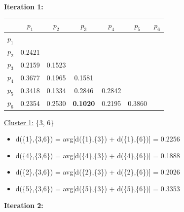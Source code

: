 \documentclass[11pt]{article}
\begin{document}
	\textbf{Iteration 1:}
	
	\begin{center}
    	\begin{adjustbox}{max width=\textwidth}
		\begin{tabular}{ | c | c | c | c | c | c | c |}
	  	 	\hline

	  	 	& \textbf{$p_1$} & \textbf{$p_2$} & \textbf{$p_3$} & \textbf{$p_4$} & \textbf{$p_5$} & \textbf{$p_6$}\\
	  	 	\hline
	  	 	
	  	 	\textbf{$p_1$} &  &  &  &  &  &\\
	  	 	\hline
	  	 	
	  	 	\textbf{$p_2$} & 0.2421 &  &  &  &  &  \\
	  	 	\hline
	  	 	
	  	 	\textbf{$p_3$} & 0.2159 & 0.1523 &  &  &  & \\
	  	 	\hline
	  	 	
	  	 	\textbf{$p_4$} & 0.3677 & 0.1965 & 0.1581 &  &  & \\
	  	 	\hline
	  	 	
	  	 	\textbf{$p_5$} & 0.3418 & 0.1334 & 0.2846 & 0.2842 &  & \\
	  	 	\hline	
	  	 	
	  	 	\textbf{$p_6$} & 0.2354 & 0.2530 & \textbf{0.1020} & 0.2195 & 0.3860 & \\
	  	 	\hline			
    		\end{tabular}
    	\end{adjustbox}
	\end{center}
	
	\underline{Cluster 1:} \{3, 6\}
	
	\begin{itemize}
		\item d(\{1\},\{3,6\}) = avg[d(\{1\},\{3\}) + d(\{1\},\{6\})] = 0.2256
		\item d(\{4\},\{3,6\}) = avg[d(\{4\},\{3\}) + d(\{4\},\{6\})] = 0.1888
		\item d(\{2\},\{3,6\}) = avg[d(\{2\},\{3\}) + d(\{2\},\{6\})] = 0.2026
		\item d(\{5\},\{3,6\}) = avg[d(\{5\},\{3\}) + d(\{5\},\{6\})] = 0.3353
	\end{itemize}
	
	
	\textbf{Iteration 2:}
	
\end{document}
